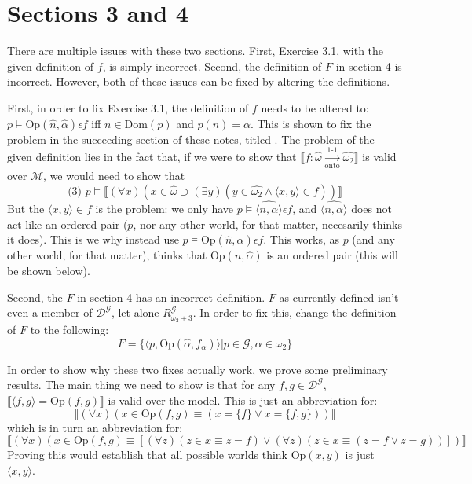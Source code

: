 \documentclass{article}
\newcommand{\lbc}{\llbracket}
\newcommand{\rbc}{\rrbracket}
\theoremstyle{definition}
\begin{document}
\section*{Sections 3 and 4}
There are multiple issues with these two sections. First, Exercise 3.1, with the given definition of $f$, is simply incorrect. Second, 
the definition of $F$ in section 4 is incorrect. However, both of these issues can be fixed by altering the definitions.

First, in order to fix Exercise 3.1, the definition of $f$ needs to be altered to: $p\vDash\textrm{Op}(\hat{n},\hat{\alpha})\epsilon f$ 
iff $n\in\textrm{Dom}(p)$ and $p(n)=\alpha$. This is shown to fix the problem in the succeeding section of these notes, titled 
. The problem of the given definition 
lies in the fact that, if we were to show that 
$\lbc f:\hat{\omega}\xrightarrow[\textrm{onto}]{\text{1-1}}\hat{\omega_2}\rbc$ is valid
over $\mathcal{M}$, we would need to show that
\[\textrm{(3) }p\vDash\lbc(\forall x)(x\in\hat{\omega}\supset(\exists y)(y\in\widehat{\omega_2}\wedge\langle x,y\rangle\in f))\rbc \]
But the $\langle x,y\rangle\in f$ is the problem: we only have 
$p\vDash\widehat{\langle n,\alpha\rangle}\epsilon f$, and $\widehat{\langle n,\alpha\rangle}$ does not act like an ordered pair ($p$, 
nor any other world, for that matter, necesarily thinks it does). This is we why instead use 
$p\vDash\textrm{Op}(\hat{n},\hat{\alpha})\epsilon f$. This works, as $p$ (and any other world, for that matter), 
thinks that $\textrm{Op}(\hat{n},\hat{\alpha})$ is an ordered pair (this will be shown below).

Second, the $F$ in section 4 has an incorrect definition. $F$ as currently defined isn't even a member of $\mathcal{D}^\mathcal{G}$, let alone 
$R^\mathcal{G}_{\omega_2+3}$. In order to fix this, change the definition of $F$ to the following:
\[ F=\{\langle p,\textrm{Op}(\hat{\alpha},f_\alpha)\rangle|p\in\mathcal{G},\alpha\in\omega_2\} \]

In order to show why these two fixes actually work, we prove some preliminary results. The main thing we need to show is that for 
any $f,g\in\mathcal{D}^\mathcal{G}$, $\lbc\langle f,g\rangle =\textrm{Op}(f,g)\rbc$ is valid over the model. This is just an 
abbreviation for:
\[ \lbc (\forall x)(x\in\textrm{Op}(f,g)\equiv (x=\{f\}\vee x=\{f,g\}))\rbc \]
which is in turn an abbreviation for:
\[ \lbc(\forall x)(x\in\textrm{Op}(f,g)\equiv[(\forall z)(z\in x\equiv z=f)\vee(\forall z)(z\in x\equiv (z=f\vee z=g))])\rbc \] 
Proving this would establish that all possible worlds think $\textrm{Op}(x,y)$ is just $\langle x,y\rangle$.
\end{document}
